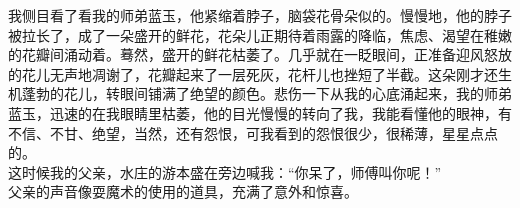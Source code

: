 我侧目看了看我的师弟蓝玉，他紧缩着脖子，脑袋花骨朵似的。慢慢地，他的脖子被拉长了，成了一朵盛开的鲜花，花朵儿正期待着雨露的降临，焦虑、渴望在稚嫩的花瓣间涌动着。蓦然，盛开的鲜花枯萎了。几乎就在一眨眼间，正准备迎风怒放的花儿无声地凋谢了，花瓣起来了一层死灰，花杆儿也挫短了半截。这朵刚才还生机蓬勃的花儿，转眼间铺满了绝望的颜色。悲伤一下从我的心底涌起来，我的师弟蓝玉，迅速的在我眼睛里枯萎，他的目光慢慢的转向了我，我能看懂他的眼神，有不信、不甘、绝望，当然，还有怨恨，可我看到的怨恨很少，很稀薄，星星点点的。\\

这时候我的父亲，水庄的游本盛在旁边喊我：“你呆了，师傅叫你呢！”\\

父亲的声音像耍魔术的使用的道具，充满了意外和惊喜。\\